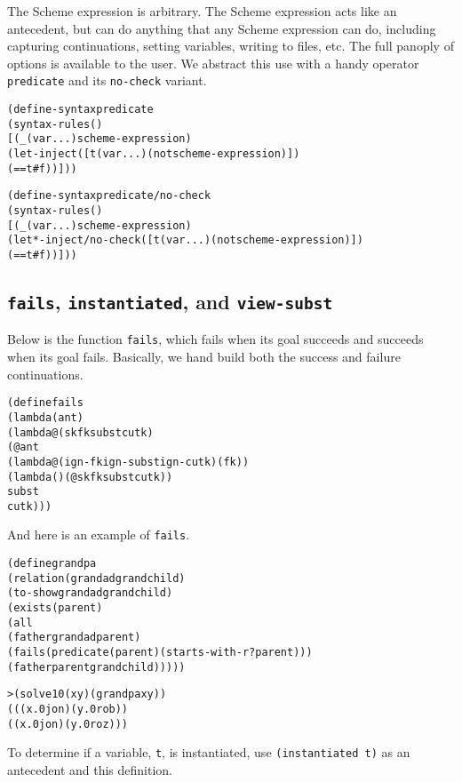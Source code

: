 The Scheme expression is arbitrary.  The Scheme expression acts like an
antecedent, but can do anything that any Scheme expression can do, including
capturing continuations, setting variables, writing to files, etc.  The
full panoply of options is available to the user.  We abstract this use
with a handy operator \texttt{predicate} and its \texttt{no-check} variant.

\begin{alltt}
(define-syntax predicate
  (syntax-rules ()
    [(_ (var ...) scheme-expression)
     (let-inject ([t (var ...) (not scheme-expression)])
       (== t #f))]))

(define-syntax predicate/no-check
  (syntax-rules ()
    [(_ (var ...) scheme-expression)
     (let*-inject/no-check ([t (var ...) (not scheme-expression)])
       (== t #f))]))
\end{alltt}

\subsection{\texttt{fails}, \texttt{instantiated}, and \texttt{view-subst}}

Below is the function \texttt{fails}, which fails when its goal succeeds and
succeeds when its goal fails.  Basically, we hand build both the success
and failure continuations.

\begin{alltt}
(define fails
  (lambda (ant)
    (lambda@ (sk fk subst cutk)
      (@ ant
        (lambda@ (ign-fk ign-subst ign-cutk) (fk))
        (lambda () (@ sk fk subst cutk))
        subst
        cutk)))
\end{alltt}

\noindent
And here is an example of \texttt{fails}.

\begin{alltt}
(define grandpa
  (relation (grandad grandchild)
    (to-show grandad grandchild)
    (exists (parent)
      (all
        (father grandad parent)
        (fails (predicate (parent) (starts-with-r? parent)))
        (father parent grandchild)))))
\end{alltt}

\begin{alltt}
> (solve 10 (x y) (grandpa x y))
(((x.0 jon) (y.0 rob))
 ((x.0 jon) (y.0 roz)))
\end{alltt}

To determine if a variable, \texttt{t}, is instantiated, use
\texttt{(instantiated t)} as an antecedent and this definition.

